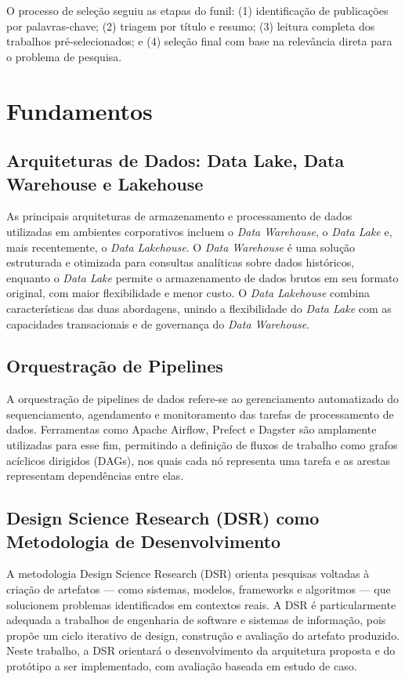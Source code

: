 \documentclass[
    12pt,                %
    openright,           %
    oneside,             %
    a4paper,             %
    english,             %
    brazil               %
]{abntex2}
\begin{document}
O processo de seleção seguiu as etapas do funil: (1) identificação de publicações por palavras-chave; (2) triagem por título e resumo; (3) leitura completa dos trabalhos pré-selecionados; e (4) seleção final com base na relevância direta para o problema de pesquisa.

\section{Fundamentos}
\label{sec:fundamentos}

\subsection{Arquiteturas de Dados: Data Lake, Data Warehouse e Lakehouse}

As principais arquiteturas de armazenamento e processamento de dados utilizadas em ambientes corporativos incluem o \textit{Data Warehouse}, o \textit{Data Lake} e, mais recentemente, o \textit{Data Lakehouse}. O \textit{Data Warehouse} é uma solução estruturada e otimizada para consultas analíticas sobre dados históricos, enquanto o \textit{Data Lake} permite o armazenamento de dados brutos em seu formato original, com maior flexibilidade e menor custo. O \textit{Data Lakehouse} combina características das duas abordagens, unindo a flexibilidade do \textit{Data Lake} com as capacidades transacionais e de governança do \textit{Data Warehouse}.

\subsection{Orquestração de Pipelines}

A orquestração de pipelines de dados refere-se ao gerenciamento automatizado do sequenciamento, agendamento e monitoramento das tarefas de processamento de dados. Ferramentas como Apache Airflow, Prefect e Dagster são amplamente utilizadas para esse fim, permitindo a definição de fluxos de trabalho como grafos acíclicos dirigidos (DAGs), nos quais cada nó representa uma tarefa e as arestas representam dependências entre elas.

\subsection{Design Science Research (DSR) como Metodologia de Desenvolvimento}

A metodologia Design Science Research (DSR) orienta pesquisas voltadas à criação de artefatos — como sistemas, modelos, frameworks e algoritmos — que solucionem problemas identificados em contextos reais. A DSR é particularmente adequada a trabalhos de engenharia de software e sistemas de informação, pois propõe um ciclo iterativo de design, construção e avaliação do artefato produzido. Neste trabalho, a DSR orientará o desenvolvimento da arquitetura proposta e do protótipo a ser implementado, com avaliação baseada em estudo de caso.
\end{document}
